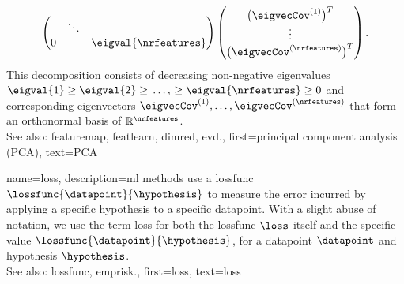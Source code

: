 {{$$\begin{pmatrix}
										& \ddots &   \\
					0                 &        & \eigval{\nrfeatures}
					\end{pmatrix}
					\begin{pmatrix}
					\big(\eigvecCov^{(1)}\big)^{T} \\
					\vdots                         \\
					\big(\eigvecCov^{(\nrfeatures)}\big)^{T}
					\end{pmatrix}.$$
				This decomposition consists of decreasing non-negative \glspl{eigenvalue} 
				$\eigval{1} \geq \eigval{2} \geq \,\ldots, \,\geq \eigval{\nrfeatures} 
				\geq 0$ and corresponding \glspl{eigenvector} $\eigvecCov^{(1)},\ldots,\eigvecCov^{(\nrfeatures)}$ 
				that form an orthonormal basis of $\mathbb{R}^{\nrfeatures}$.
				 \\
		See also: \gls{featuremap}, \gls{featlearn}, \gls{dimred},  
		\gls{evd}.},
	first={principal component analysis (PCA)},
	text={PCA} 
}
	
{name={loss}, 
	description={\gls{ml} methods use a 
		\gls{lossfunc} $\lossfunc{\datapoint}{\hypothesis}$ to measure the error incurred 
		by applying a specific \gls{hypothesis} to a specific \gls{datapoint}. With a
		slight abuse of notation, we use the term loss for both the \gls{lossfunc} $\loss$ 
		itself and the specific value $\lossfunc{\datapoint}{\hypothesis}$, for a \gls{datapoint} $\datapoint$ 
		and \gls{hypothesis} $\hypothesis$.
				\\
		See also: \gls{lossfunc}, \gls{emprisk}.},
	first={loss},
	text={loss} 
}

